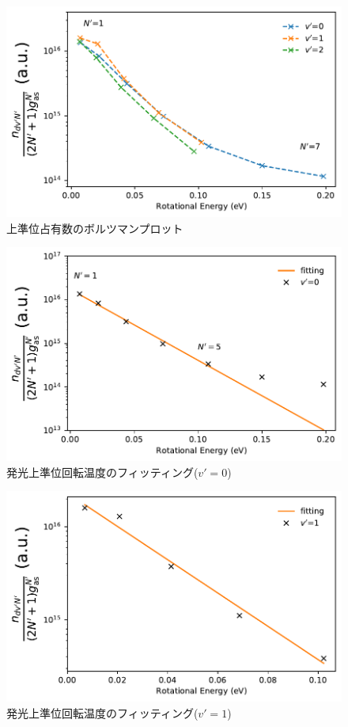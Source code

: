 \begin{figure}
    \centering
    \includegraphics[width=15cm]{pictures/upper-boltzmann-plot.pdf}
    \caption{上準位占有数のボルツマンプロット}
    \label{fig:upper-boltzmann-plot}
\end{figure}

\begin{figure}
    \centering
    \includegraphics[width=15cm]{pictures/upper-fitting-0.pdf}
    \caption{発光上準位回転温度のフィッティング($v'=0$)}
    \label{fig:upper-fitting-0}
\end{figure}

\begin{figure}
    \centering
    \includegraphics[width=15cm]{pictures/upper-fitting-1.pdf}
    \caption{発光上準位回転温度のフィッティング($v'=1$)}
    \label{fig:upper-fitting-1}
\end{figure}

